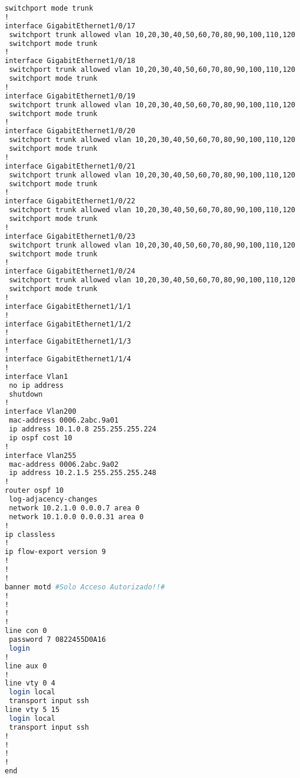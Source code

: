 \begin{lstlisting}[language=Bash, caption={Configuración Completa Switch Core 2}]
 switchport mode trunk
!
interface GigabitEthernet1/0/17
 switchport trunk allowed vlan 10,20,30,40,50,60,70,80,90,100,110,120
 switchport mode trunk
!
interface GigabitEthernet1/0/18
 switchport trunk allowed vlan 10,20,30,40,50,60,70,80,90,100,110,120
 switchport mode trunk
!
interface GigabitEthernet1/0/19
 switchport trunk allowed vlan 10,20,30,40,50,60,70,80,90,100,110,120
 switchport mode trunk
!
interface GigabitEthernet1/0/20
 switchport trunk allowed vlan 10,20,30,40,50,60,70,80,90,100,110,120
 switchport mode trunk
!
interface GigabitEthernet1/0/21
 switchport trunk allowed vlan 10,20,30,40,50,60,70,80,90,100,110,120
 switchport mode trunk
!
interface GigabitEthernet1/0/22
 switchport trunk allowed vlan 10,20,30,40,50,60,70,80,90,100,110,120
 switchport mode trunk
!
interface GigabitEthernet1/0/23
 switchport trunk allowed vlan 10,20,30,40,50,60,70,80,90,100,110,120
 switchport mode trunk
!
interface GigabitEthernet1/0/24
 switchport trunk allowed vlan 10,20,30,40,50,60,70,80,90,100,110,120
 switchport mode trunk
!
interface GigabitEthernet1/1/1
!
interface GigabitEthernet1/1/2
!
interface GigabitEthernet1/1/3
!
interface GigabitEthernet1/1/4
!
interface Vlan1
 no ip address
 shutdown
!
interface Vlan200
 mac-address 0006.2abc.9a01
 ip address 10.1.0.8 255.255.255.224
 ip ospf cost 10
!
interface Vlan255
 mac-address 0006.2abc.9a02
 ip address 10.2.1.5 255.255.255.248
!
router ospf 10
 log-adjacency-changes
 network 10.2.1.0 0.0.0.7 area 0
 network 10.1.0.0 0.0.0.31 area 0
!
ip classless
!
ip flow-export version 9
!
!
!
banner motd #Solo Acceso Autorizado!!#
!
!
!
!
line con 0
 password 7 0822455D0A16
 login
!
line aux 0
!
line vty 0 4
 login local
 transport input ssh
line vty 5 15
 login local
 transport input ssh
!
!
!
!
end
\end{lstlisting}
